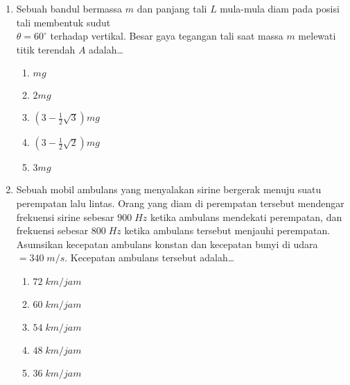 \documentclass[A4,12PT, english, twocolumn]{journal}
\begin{document}
\begin{enumerate}
\item Sebuah bandul bermassa $m$ dan panjang tali $L$ mula-mula diam pada posisi tali membentuk sudut \\ $\theta=60^\circ$ terhadap vertikal. Besar gaya tegangan tali saat massa $m$ melewati titik terendah $A$ adalah\dots
\begin{center}
\end{center}
    \begin{enumerate}
        \item $mg$
        \item $2mg$
        \item $\left(3-\frac{1}{2}\sqrt{3} \right)mg$
        \item $\left(3-\frac{1}{2}\sqrt{2} \right)mg$
        \item $3mg$
    \end{enumerate}

\item Sebuah mobil ambulans yang menyalakan sirine bergerak menuju suatu perempatan lalu lintas. Orang yang diam di perempatan tersebut mendengar frekuensi sirine sebesar $900 \; Hz$ ketika ambulans mendekati perempatan, dan frekuensi sebesar $800 \; Hz$ ketika ambulans tersebut menjauhi perempatan. Asumsikan kecepatan ambulans konstan dan kecepatan bunyi di udara $=340 \; m/s$. Kecepatan ambulans tersebut adalah\dots
    \begin{enumerate}
        \item $72 \; km/jam$
        \item $60 \; km/jam$
        \item $54 \; km/jam$
        \item $48 \; km/jam$
        \item $36 \; km/jam$
    \end{enumerate}
    

\end{enumerate}
\end{document}
